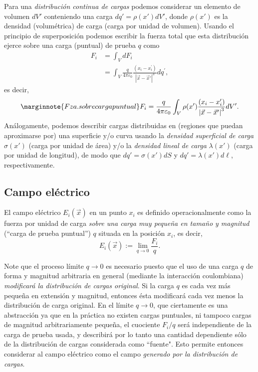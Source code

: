 Para una \textit{distribución continua de cargas} podemos considerar un elemento de
volumen $dV'$ conteniendo una carga $dq'=\rho(x')dV'$, donde $\rho(x')$ es
la densidad (volumétrica) de carga (carga por unidad de volumen). Usando el
principio de superposición podemos escribir la fuerza total que esta
distribución ejerce sobre una carga (puntual) de prueba $q$ como
\begin{align}
F_i  &= \int_V dF_i \\
& =\int_V\frac{q}{4\pi\varepsilon_0}\frac{\left(  x_i-x_i^{\prime
}\right)  }{\left\vert \vec x-\vec x'\right\vert ^3}dq^{\prime},
\end{align}
es decir,
\begin{equation}\marginnote{Fza. sobre carga puntual}
F_i  =\frac{q}{4\pi\varepsilon_0}\int_V\rho(x')\frac{\left(x_i-x_i'\right)
}{\left\vert \vec x-\vec x'\right\vert
^3}dV' .\label{leycoulomb-conti}
\end{equation}
Análogamente, podemos describir cargas distribuidas en (regiones que puedan
aproximarse por) una superficie y/o curva usando la \textit{densidad superficial de
carga} $\sigma(x')$ (carga por unidad de área) y/o la \textit{densidad lineal de carga} $\lambda(x')$ (carga por unidad de longitud), de modo que $dq'=\sigma(x')dS$
y $dq'=\lambda(x')d\ell$, respectivamente.

\subsection{Campo eléctrico}
El campo eléctrico $E_i(\vec{x})$ en un punto $x_i$ es definido operacionalmente como la fuerza por unidad de carga \textit{sobre una carga muy pequeña en tamaño y magnitud} (``carga de prueba puntual'') $q$ situada en la posición $x_i$, es decir,
\begin{equation}
E_i(\vec x):=\lim_{q\rightarrow0}\frac{F_i}{q}.
\end{equation}

Note que el proceso límite ${q\rightarrow0}$ es necesario puesto que el uso de una carga $q$ de forma y magnitud arbitraria en general (mediante la interacción coulombiana) \textit{modificará la distribución de cargas original}. Si la carga $q$ es cada vez más pequeña en extensión y magnitud, entonces ésta modificará cada vez menos la distribución de carga original. En el límite ${q\rightarrow0}$, que ciertamente es una abstracción ya que en la práctica no existen cargas puntuales, ni tampoco cargas de magnitud arbitrariamente pequeña, el cuociente $F_i/q$ será independiente de la carga de prueba usada, y describirá por lo tanto una cantidad dependiente sólo de la distribución de cargas considerada como ``fuente". Esto permite entonces considerar al campo eléctrico como el campo \textit{generado por la distribución de cargas}.

